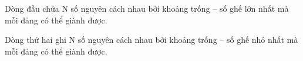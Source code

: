 Dòng đầu chứa N số nguyên cách nhau bởi khoảng trống – số ghế lớn nhất mà mỗi đảng có thể giành được.  

   Dòng thứ hai ghi N số nguyên cách nhau bởi khoảng trống – số ghế nhỏ nhất mà mỗi đảng có thể giành được.  

\